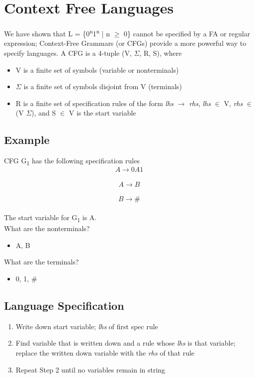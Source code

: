 \documentclass[11pt]{article}
\begin{document}
\section{Context Free Languages}
\label{sec:org30a3deb}
We have shown that L = \{0\textsuperscript{n}1\textsuperscript{n} | n \(\ge\) 0\} cannot be specified by a FA or regular expression; Context-Free Grammars (or CFGs) provide a more powerful way to specify languages. A CFG is a 4-tuple (V, \(\Sigma\), R, S), where\\
\begin{itemize}
\item V is a finite set of symbols (variable or nonterminals)\\
\item \(\Sigma\) is a finite set of symbols disjoint from V (terminals)\\
\item R is a finite set of specification rules of the form \emph{lhs} \(\rightarrow\) \emph{rhs}, \emph{lhs} \(\in\) V, \emph{rhs} \(\in\) (V \union \(\Sigma\)), and S \(\in\) V is the start variable\\
\end{itemize}
\subsection{Example}
\label{sec:orga4405cb}
CFG G\textsubscript{1} has the following specification rules\\
\[
A \rightarrow{} 0A1
\]\\
\[
A \rightarrow{} B
\]\\
\[
B \rightarrow{} \#
\]\\

The start variable for G\textsubscript{1} is A.\\
What are the nonterminals?\\
\begin{itemize}
\item A, B\\
\end{itemize}
What are the terminals?\\
\begin{itemize}
\item 0, 1, \#\\
\end{itemize}
\subsection{Language Specification}
\label{sec:org522900e}
\begin{enumerate}
\item Write down start variable; \emph{lhs} of first spec rule\\
\item Find variable that is written down and a rule whose \emph{lhs} is that variable; replace the written down variable with the \emph{rhs} of that rule\\
\item Repeat Step 2 until no variables remain in string\\
\end{enumerate}
\end{document}
